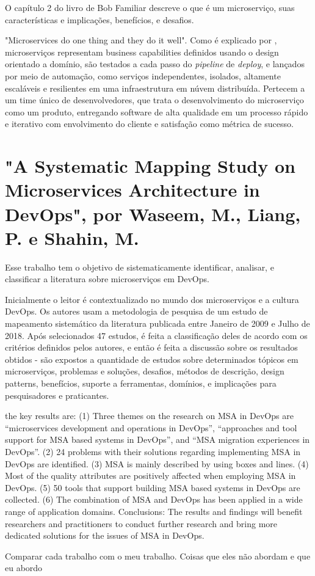 O capítulo 2 do livro de Bob Familiar descreve o que é um microserviço, suas características e implicações, benefícios, e desafios. 

"Microservices do one thing and they do it well". Como é explicado por  , microserviços representam business capabilities definidos usando o design orientado a domínio, são testados a cada passo do \emph{pipeline} de \emph{deploy}, e lançados por meio de automação, como serviços independentes, isolados, altamente escaláveis e resilientes em uma infraestrutura em núvem distribuída. Pertecem a um time único de desenvolvedores, que trata o desenvolvimento do microserviço como um produto, entregando software de alta qualidade em um processo rápido e iterativo com envolvimento do cliente e satisfação como métrica de sucesso.

\section*{"A Systematic Mapping Study on Microservices Architecture in DevOps", por Waseem, M., Liang, P. e Shahin, M.}

Esse trabalho tem o objetivo de sistematicamente identificar, analisar, e classificar a literatura sobre microserviços em DevOps.

Inicialmente o leitor é contextualizado no mundo dos microserviços e a cultura DevOps. Os autores usam a metodologia de pesquisa de um estudo de mapeamento sistemático da literatura publicada entre Janeiro de 2009 e Julho de 2018. Após selecionados 47 estudos, é feita a classificação deles de acordo com os critérios definidos pelos autores, e então é feita a discussão sobre os resultados obtidos - são expostos a quantidade de estudos sobre determinados tópicos em microserviços, problemas e soluções, desafios, métodos de descrição, design patterns, benefícios, suporte a ferramentas, domínios, e implicações para pesquisadores e praticantes.

the key results are: (1) Three themes on the research on MSA in DevOps are “microservices development and operations in DevOps”, “approaches and tool support for MSA based systems in DevOps”, and “MSA migration experiences in DevOps”. (2) 24 problems with their solutions regarding implementing MSA in DevOps are identified. (3) MSA is mainly described by using boxes and lines. (4) Most of the quality attributes are positively affected when employing MSA in DevOps. (5) 50 tools that support building MSA based systems in DevOps are collected. (6) The combination of MSA and DevOps has been applied in a wide range of application domains. Conclusions: The results and findings will benefit researchers and practitioners to conduct further research and bring more dedicated solutions for the issues of MSA in DevOps.


Comparar cada trabalho com o meu trabalho. Coisas que eles não abordam e que eu abordo